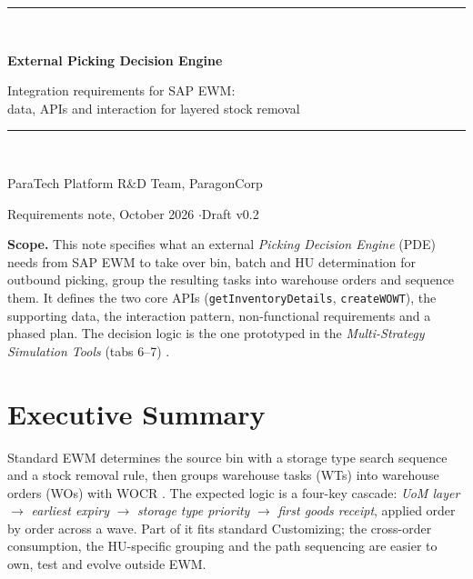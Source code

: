 \documentclass[11pt,a4paper]{article}
\newcommand{\api}[1]{\texttt{#1}}
\begin{document}
\begin{titlepage}
\centering\vspace*{3cm}
{\color{pxblue}\rule{\linewidth}{1.2pt}}\\[6mm]
{\Huge\bfseries External Picking Decision Engine\par}
\vspace{4mm}
{\Large Integration requirements for SAP EWM:\\data, APIs and interaction for layered stock removal\par}
\vspace{4mm}
{\color{pxblue}\rule{\linewidth}{1.2pt}}\\[2cm]
{\large ParaTech Platform R\&D Team, ParagonCorp\par}
\vspace{2mm}
{\normalsize Requirements note, October 2026 \quad$\cdot$\quad Draft v0.2\par}
\vspace{2cm}
\begin{minipage}{0.85\linewidth}
\small\textbf{Scope.} This note specifies what an external \emph{Picking Decision Engine} (PDE) needs from SAP EWM to take over
bin, batch and HU determination for outbound picking, group the resulting tasks into warehouse orders and sequence them.
It defines the two core APIs (\api{getInventoryDetails}, \api{createWOWT}), the supporting data, the interaction pattern,
non-functional requirements and a phased plan. The decision logic is the one prototyped in the
\emph{Multi-Strategy Simulation Tools} (tabs 6--7) \cite{sim}.
\end{minipage}
\vfill
\end{titlepage}

\tableofcontents
\newpage

\section{Executive Summary}
Standard EWM determines the source bin with a storage type search sequence and a stock removal rule, then groups
warehouse tasks (WTs) into warehouse orders (WOs) with WOCR \cite{saprem}. The expected logic is a four-key cascade:
\emph{UoM layer} $\rightarrow$ \emph{earliest expiry} $\rightarrow$ \emph{storage type priority} $\rightarrow$ \emph{first goods receipt},
applied order by order across a wave. Part of it fits standard Customizing; the cross-order consumption, the HU-specific
grouping and the path sequencing are easier to own, test and evolve outside EWM.
\end{document}
